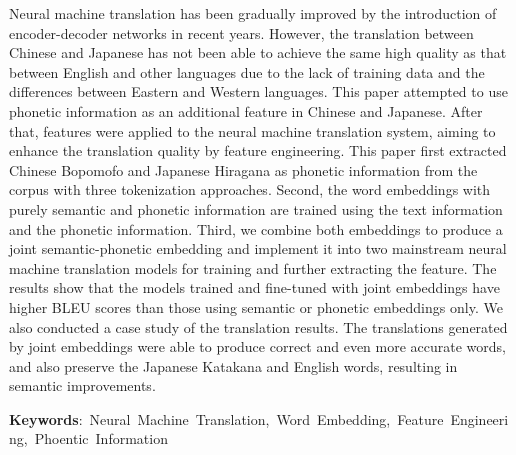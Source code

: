 Neural machine translation has been gradually improved by the introduction of encoder-decoder networks in recent years. However, the translation between Chinese and Japanese has not been able to achieve the same high quality as that between English and other languages due to the lack of training data and the differences between Eastern and Western languages. This paper attempted to use phonetic information as an additional feature in Chinese and Japanese. After that, features were applied to the neural machine translation system, aiming to enhance the translation quality by feature engineering. This paper first extracted Chinese Bopomofo and Japanese Hiragana as phonetic information from the corpus with three tokenization approaches. Second, the word embeddings with purely semantic and phonetic information are trained using the text information and the phonetic information. Third, we combine both embeddings to produce a joint semantic-phonetic embedding and implement it into two mainstream neural machine translation models for training and further extracting the feature. The results show that the models trained and fine-tuned with joint embeddings have higher BLEU scores than those using semantic or phonetic embeddings only. We also conducted a case study of the translation results. The translations generated by joint embeddings were able to produce correct and even more accurate words, and also preserve the Japanese Katakana and English words, resulting in semantic improvements. 



\begin{flushleft}
\mbox{{\bf Keywords}: Neural Machine Translation, Word Embedding, Feature Engineering, Phoentic Information}
\end{flushleft}


